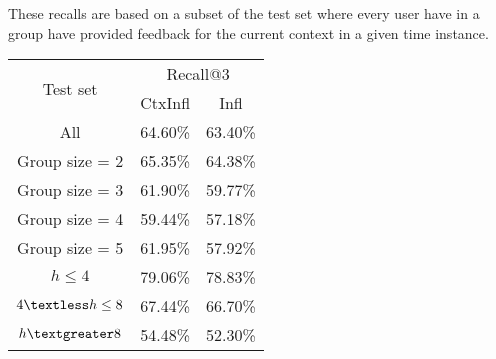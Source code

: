 \begin{frame}
These recalls are based on a subset of the test set where every user have in a group have provided feedback for the 
current context in a given time instance. 
\begin{table}[]
\centering
			\begin{tabular}{|c|c|c|}\hline
			\multirow{2}{*}{Test set }  & \multicolumn{2}{c|}{Recall@3}  \\ \hhline{~--}
			            		 & CtxInfl     	&	Infl\\ \hline
			All                  &  64.60\% 	&	63.40\%\\ \hline
			Group size = 2       &  65.35\% 	&	64.38\%\\
			Group size = 3       &  61.90\% 	&	59.77\%\\
			Group size = 4       &  59.44\% 	&	57.18\%\\
			Group size = 5       &  61.95\% 	&	57.92\%\\ \hline
			$h \leq 4 $             & 79.06\%&	78.83\% \\
			$4 \textless h \leq 8$ & 67.44\%&	66.70\% \\
			$h \textgreater 8$     & 54.48\%&	52.30\%\\ \hline
		\end{tabular}
\end{table}
\end{frame}
